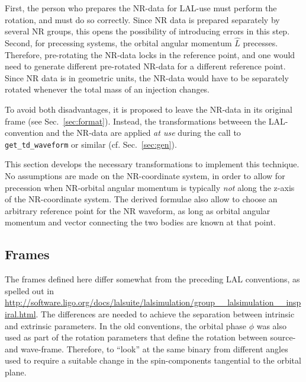 \documentclass[11pt,tightenlines,article,amssymb,amsmath,amsfonts,superscriptaddress]{revtex4}
\newcommand{\lNR}{\hat L}
\begin{document}
First, the person who prepares the NR-data for LAL-use must perform
the rotation, and must do so correctly. Since NR data is prepared
separately by several NR groups, this opens the possibility of
introducing errors in this step.  Second, for precessing systems, the
orbital angular momentum $\lNR$ precesses.  Therefore, pre-rotating
the NR-data locks in the reference point, and one would need to
generate different pre-rotated NR-data for a different reference point.
Since NR data is in geometric units, the NR-data would have to be
separately rotated whenever the total mass of an injection changes.

To avoid both disadvantages, it is proposed to leave the NR-data in
its original frame (see Sec.~\ref{sec:format}).  Instead, the transformations betweeen the
LAL-convention and the NR-data are applied \emph{at use} during the
call to \texttt{get\_td\_waveform} or similar (cf. Sec.~\ref{sec:gen}).

This section develops the necessary transformations to implement this
technique.  No assumptions are made on the NR-coordinate system, in
order to allow for precession when NR-orbital angular momentum is
typically \emph{not} along the z-axis of the NR-coordinate system.
The derived formulae also allow to choose an arbitrary reference point
for the NR waveform, as long as orbital angular momentum and vector
connecting the two bodies are known at that point.




\subsection{Frames}
\label{sec:Frames}

The frames defined here differ somewhat from the preceding LAL
conventions, as spelled out in
\url{http://software.ligo.org/docs/lalsuite/lalsimulation/group__lalsimulation__inspiral.html}.
The differences are needed to achieve the separation between intrinsic
and extrinsic parameters.  In the old conventions, the orbital phase
$\phi$ was also used as part of the rotation parameters that define
the rotation between source- and wave-frame.  Therefore, to ``look''
at the same binary from different angles used to require a suitable
change in the spin-components tangential to the orbital plane.
\end{document}
